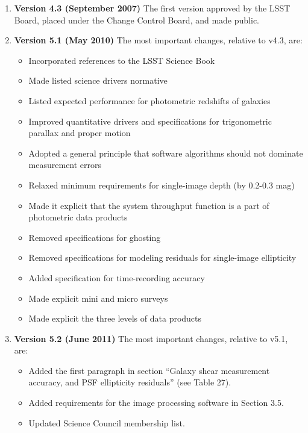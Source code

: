 \begin{enumerate}
\item \textbf{Version 4.3 (September 2007)} The first version approved by the LSST Board, placed under the Change
 Control Board, and made public.

\item \textbf{Version 5.1 (May 2010)} The most important changes, relative to v4.3, are:
\begin{itemize}
\item Incorporated references to the LSST Science Book
\item Made listed science drivers normative
\item Listed expected performance for photometric redshifts of galaxies
\item Improved quantitative drivers and specifications for trigonometric parallax and proper motion
\item Adopted a general principle that software algorithms should not dominate measurement errors
\item Relaxed minimum requirements for single-image depth (by 0.2-0.3 mag)
\item Made it explicit that the system throughput function is a part of photometric data products
\item Removed specifications for ghosting
\item Removed specifications for modeling residuals for single-image ellipticity
\item Added specification for time-recording accuracy
\item Made explicit mini and micro surveys
\item Made explicit the three levels of data products
\end{itemize}

\item \textbf{Version 5.2 (June 2011)} The most important changes, relative to v5.1, are:
\begin{itemize}
\item Added the first paragraph in section ``Galaxy shear measurement accuracy, and PSF ellipticity residuals''
          (see Table 27).
\item Added requirements for the image processing software in Section 3.5.
\item Updated Science Council membership list.
\end{itemize}

\end{enumerate}
